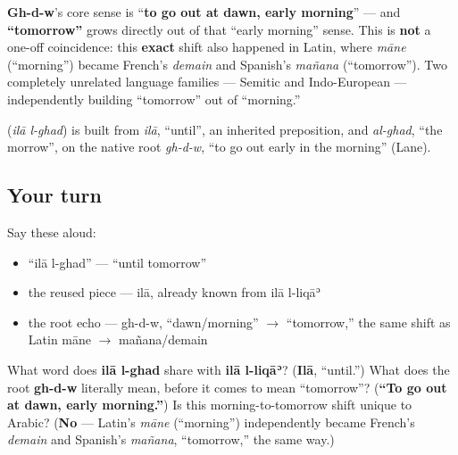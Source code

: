 \begin{culture}
\textbf{Gh-d-w}'s core sense is \textquotedblleft{}\textbf{to go out at dawn, early morning}\textquotedblright{} — and \textbf{\textquotedblleft{}tomorrow\textquotedblright{}} grows directly out of that \textquotedblleft{}early morning\textquotedblright{} sense. This is \textbf{not} a one-off coincidence: this \textbf{exact} shift also happened in Latin, where \emph{māne} (\textquotedblleft{}morning\textquotedblright{}) became French's \emph{demain} and Spanish's \emph{mañana} (\textquotedblleft{}tomorrow\textquotedblright{}). Two completely unrelated language families — Semitic and Indo-European — independently building \textquotedblleft{}tomorrow\textquotedblright{} out of \textquotedblleft{}morning.\textquotedblright{}
\end{culture}

\begin{cousinweb}
\textbf{ } (\emph{ilā l-ghad}) is built from \emph{ilā}, \textquotedblleft{}until\textquotedblright{}, an inherited preposition, and \emph{al-ghad}, \textquotedblleft{}the morrow\textquotedblright{}, on the native root \emph{gh-d-w}, \textquotedblleft{}to go out early in the morning\textquotedblright{} (Lane).
\end{cousinweb}

\subsection*{Your turn}
Say these aloud:

\begin{itemize}
\raggedright
  \item \textquotedblleft{}ilā l-ghad\textquotedblright{} — \textquotedblleft{}until tomorrow\textquotedblright{}
  \item the reused piece — ilā, already known from ilā l-liqāʾ
  \item the root echo — gh-d-w, \textquotedblleft{}dawn/morning\textquotedblright{} $\to$ \textquotedblleft{}tomorrow,\textquotedblright{} the same shift as Latin māne $\to$ mañana/demain
\end{itemize}

\begin{tcolorbox}[breakable,colback=teal!4,colframe=teal!35!black,title={Before you move on}]
What word does \textbf{ilā l-ghad} share with \textbf{ilā l-liqāʾ}? (\textbf{Ilā}, \textquotedblleft{}until.\textquotedblright{}) What does the root \textbf{gh-d-w} literally mean, before it comes to mean \textquotedblleft{}tomorrow\textquotedblright{}? (\textbf{\textquotedblleft{}To go out at dawn, early morning.\textquotedblright{}}) Is this morning-to-tomorrow shift unique to Arabic? (\textbf{No} — Latin's \emph{māne} (\textquotedblleft{}morning\textquotedblright{}) independently became French's \emph{demain} and Spanish's \emph{mañana}, \textquotedblleft{}tomorrow,\textquotedblright{} the same way.)
\end{tcolorbox}
